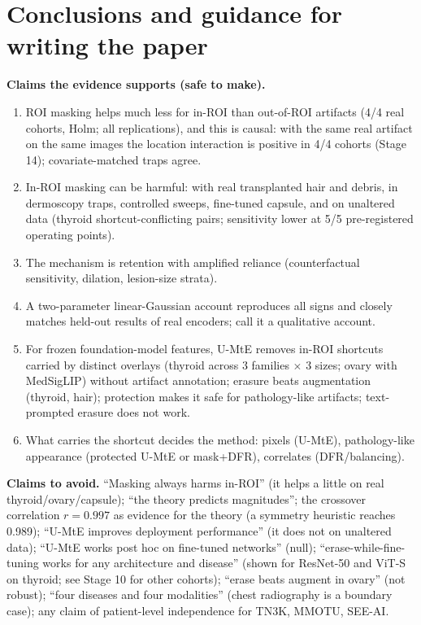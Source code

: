 \documentclass[10pt,a4paper]{article}
\begin{document}
\section{Conclusions and guidance for writing the paper}
\textbf{Claims the evidence supports (safe to make).}
\begin{enumerate}[leftmargin=*]\itemsep1pt
\item ROI masking helps much less for in-ROI than out-of-ROI artifacts (4/4 real cohorts, Holm; all replications),
and this is causal: with the same real artifact on the same images the location interaction is positive in 4/4 cohorts
(Stage 14); covariate-matched traps agree.
\item In-ROI masking can be harmful: with real transplanted hair and debris, in dermoscopy traps, controlled sweeps,
fine-tuned capsule, and on unaltered data (thyroid shortcut-conflicting pairs; sensitivity lower at 5/5 pre-registered
operating points).
\item The mechanism is retention with amplified reliance (counterfactual sensitivity, dilation, lesion-size strata).
\item A two-parameter linear-Gaussian account reproduces all signs and closely matches held-out results of real encoders;
call it a qualitative account.
\item For frozen foundation-model features, U-MtE removes in-ROI shortcuts carried by distinct overlays (thyroid across
3 families $\times$ 3 sizes; ovary with MedSigLIP) without artifact annotation; erasure beats augmentation (thyroid, hair);
protection makes it safe for pathology-like artifacts; text-prompted erasure does not work.
\item What carries the shortcut decides the method: pixels (U-MtE), pathology-like appearance (protected U-MtE or
mask+DFR), correlates (DFR/balancing).
\end{enumerate}
\textbf{Claims to avoid.} ``Masking always harms in-ROI'' (it helps a little on real thyroid/ovary/capsule); ``the
theory predicts magnitudes''; the crossover correlation $r=0.997$ as evidence for the theory (a symmetry heuristic
reaches 0.989); ``U-MtE improves deployment performance'' (it does not on unaltered data); ``U-MtE works post hoc on fine-tuned networks'' (null); ``erase-while-fine-tuning works for any architecture and
disease'' (shown for ResNet-50 and ViT-S on thyroid; see Stage 10 for other cohorts); ``erase beats augment in ovary'' (not robust); ``four diseases and four
modalities'' (chest radiography is a boundary case); any claim of patient-level independence for TN3K, MMOTU, SEE-AI.
\end{document}
